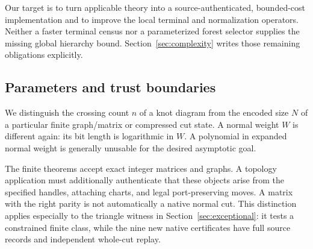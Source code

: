Our target is to turn applicable theory into a source-authenticated,
bounded-cost implementation and to improve the local terminal and
normalization operators.  Neither a faster terminal census nor a
parameterized forest selector supplies the missing global hierarchy bound.
Section~\ref{sec:complexity} writes those remaining obligations explicitly.

\subsection{Parameters and trust boundaries}

We distinguish the crossing count $n$ of a knot diagram from the encoded
size $N$ of a particular finite graph/matrix or compressed cut state.
A normal weight $W$ is different again: its bit length is logarithmic in
$W$.  A polynomial in expanded normal weight is generally unusable for
the desired asymptotic goal.

The finite theorems accept exact integer matrices and graphs.  A topology
application must additionally authenticate that these objects arise from
the specified handles, attaching charts, and legal port-preserving moves.
A matrix with the right parity is not automatically a native normal cut.
This distinction applies especially to the triangle witness in
Section~\ref{sec:exceptional}: it tests a constrained finite class, while
the nine new native certificates have full source records and independent
whole-cut replay.
